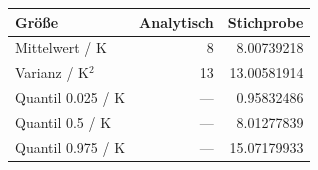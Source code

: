 \begin{tabular}{lrr}\toprule Größe & Analytisch & Stichprobe\\\midrule
Mittelwert / K & 8 & 8.00739218\\
Varianz / K$^2$ & 13 & 13.00581914\\
Quantil 0.025 / K & --- & 0.95832486\\
Quantil 0.5 / K & --- & 8.01277839\\
Quantil 0.975 / K & --- & 15.07179933\\
\bottomrule\end{tabular}
